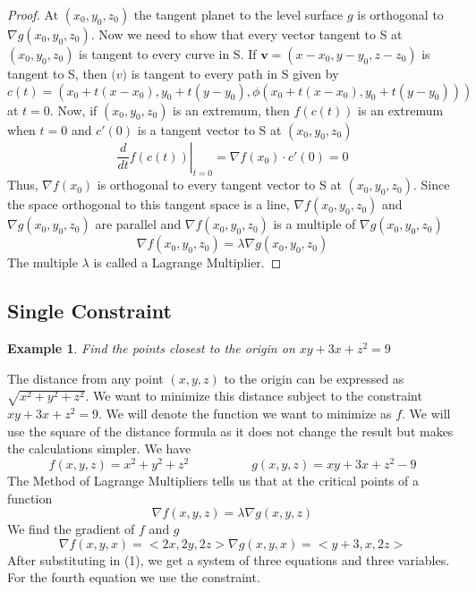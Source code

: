 \documentclass[]{article}
\newtheorem{example}{Example}
\begin{document}
\begin{proof}
    At $(x_0,y_0,z_0)$ the tangent planet to the level surface $g$ is orthogonal to $\nabla g(x_0,y_0,z_0)$.
    Now we need to show that every vector tangent to S at $(x_0,y_0,z_0)$ is tangent to every curve in S.
    If $\pmb{v}=(x-x_0,y-y_0,z-z_0)$ is tangent to S, then $\pmb(v)$ is tangent to every path in S given by
    $$
        c(t) = (x_0+t(x-x_0), y_0+t(y-y_0), \phi(x_0+t(x-x_0), y_0+t(y-y_0)))
    $$
    at $t=0$.
    Now, if $(x_0,y_0,z_0)$ is an extremum, then $f(c(t))$ is an extremum when $t=0$ and $c'(0)$ is a tangent vector to S at $(x_0,y_0,z_0)$
    $$
        \left.\frac{d}{dt}f(c(t))\right\vert_{t=0} = \nabla f(x_0)\cdot c'(0) = 0
    $$
    Thus, $\nabla f(x_0)$ is orthogonal to every tangent vector to S at $(x_0,y_0,z_0)$. Since the space orthogonal to this tangent space is a line,
    $\nabla f(x_0,y_0,z_0)$ and $\nabla g(x_0,y_0,z_0)$ are parallel and $\nabla f(x_0,y_0,z_0)$ is a multiple of $\nabla g(x_0,y_0,z_0)$
    $$
        \nabla f(x_0,y_0,z_0) = \lambda \nabla g(x_0,y_0,z_0)
    $$
    The multiple $\lambda$ is called a Lagrange Multiplier.
\end{proof}

\subsection{Single Constraint}
\begin{example}
    Find the points closest to the origin on $xy + 3x +z^2 = 9$
\end{example}
The distance from any point $(x,y,z)$ to the origin can be expressed as $\sqrt{x^2+y^2+z^2}$.
We want to minimize this distance subject to the constraint $xy+3x+z^2=9$. We will denote the function we want to minimize as $f$.
We will use the square of the distance formula as it does not change the result but makes the calculations simpler.
We have
$$
    f(x,y,z)=x^2+y^2+z^2 \hspace{30pt}  \hspace{30pt} g(x,y,z)=xy+3x+z^2-9
$$
The Method of Lagrange Multipliers tells us that at the critical points of a function
\begin{equation}
    \nabla f(x,y,z) = \lambda \nabla g(x,y,z)
\end{equation}
We find the gradient of $f$ and $g$
$$
    \nabla f(x,y,x) = <2x,2y,2z>
    \nabla g(x,y,x) = <y+3,x,2z>
$$
After substituting in (1), we get a system of three equations and three variables. For the fourth equation we use the constraint.
\end{document}
